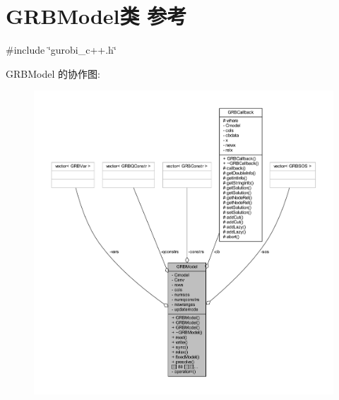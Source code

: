 \hypertarget{classGRBModel}{}\section{G\+R\+B\+Model类 参考}
\label{classGRBModel}


{\ttfamily \#include \char`\"{}gurobi\+\_\+c++.\+h\char`\"{}}



G\+R\+B\+Model 的协作图\+:
\nopagebreak
\begin{figure}[H]
\begin{center}
\leavevmode
\includegraphics[width=350pt]{classGRBModel__coll__graph}
\end{center}
\end{figure}
